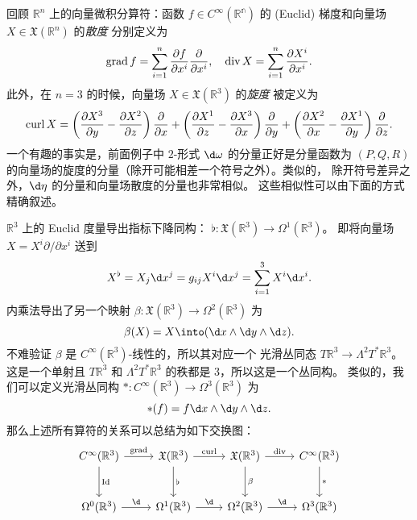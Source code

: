 回顾 $\mathbb{R}^n$ 上的向量微积分算符：函数 $f\in C^\infty(\mathbb{R^n})$
的 (Euclid) 梯度和向量场 $X\in \mathfrak{X}(\mathbb{R}^n)$ 的\emph{散度}
分别定义为
\begin{equation}
  \operatorname{grad} f=\sum_{i=1}^n\frac{\partial f}{\partial x^i}\frac{\partial}{\partial x^i},\quad 
  \operatorname{div} X=\sum_{i=1}^n\frac{\partial X^i}{\partial x^i}.
\end{equation}
此外，在 $n=3$ 的时候，向量场 $X\in \mathfrak{X}(\mathbb{R}^3)$ 的\emph{旋度}
被定义为
\[
  \operatorname{curl} X=\left(\frac{\partial X^3}{\partial y}-\frac{\partial X^2}{\partial z}\right)
  \frac{\partial}{\partial x}+  \left(\frac{\partial X^1}{\partial z}-\frac{\partial X^3}{\partial x}\right)
  \frac{\partial}{\partial y}+
  \left(\frac{\partial X^2}{\partial x}-\frac{\partial X^1}{\partial y}\right)
  \frac{\partial}{\partial z}.
\]
一个有趣的事实是，前面例子中 $2$-形式 $\d\omega$ 的分量正好是分量函数为
$(P,Q,R)$ 的向量场的旋度的分量（除开可能相差一个符号之外）。类似的，
除开符号差异之外，$\d\eta$ 的分量和向量场散度的分量也非常相似。
这些相似性可以由下面的方式精确叙述。

$\mathbb{R}^3$ 上的 Euclid 度量导出指标下降同构：
$\flat:\mathfrak{X}(\mathbb{R}^3)\to \Omega^1(\mathbb{R}^3)$。
即将向量场 $X=X^i\partial/\partial x^i$ 送到
\[
  X^\flat=X_j\d x^j=g_{ij}X^i\d x^j=\sum_{i=1}^3 X^i\d x^i.
\]
内乘法导出了另一个映射 $\beta:\mathfrak{X}(\mathbb{R}^3)\to \Omega^2(\mathbb{R}^3)$
为
\begin{equation}
  \beta(X)=X\into (\d x\wedge\d y\wedge \d z).
\end{equation}
不难验证 $\beta$ 是 $C^\infty(\mathbb{R}^3)$-线性的，所以其对应一个
光滑丛同态 $T \mathbb{R}^3\to \Lambda^2T^*\mathbb{R}^3$。这是一个单射且
$T \mathbb{R}^3$ 和 $\Lambda^2T^*\mathbb{R}^3$ 的秩都是 $3$，所以这是一个丛同构。
类似的，我们可以定义光滑丛同构 $*:C^\infty(\mathbb{R}^3)\to \Omega^3(\mathbb{R}^3)$
为
\begin{equation}
  *(f)=f\d x\wedge\d y\wedge\d z.
\end{equation}
那么上述所有算符的关系可以总结为如下交换图：
\begin{equation}
  \begin{tikzcd}[row sep=large]
    C^\infty(\mathbb{R}^3)\arrow[r,"\grad"]\arrow[d,"\Id"]
    & \mathfrak{X}(\mathbb{R}^3)\arrow[r,"\curl"]\arrow[d,"\flat"]
    & \mathfrak{X}(\mathbb{R}^3)\arrow[r,"\dive"]\arrow[d,"\beta"]
    & C^\infty(\mathbb{R}^3)\arrow[d,"*"]
    \\
    \Omega^0(\mathbb{R}^3)\arrow[r,"\d"] & 
    \Omega^1(\mathbb{R}^3)\arrow[r,"\d"] & 
    \Omega^2(\mathbb{R}^3)\arrow[r,"\d"] & 
    \Omega^3(\mathbb{R}^3)
  \end{tikzcd}
\end{equation}

